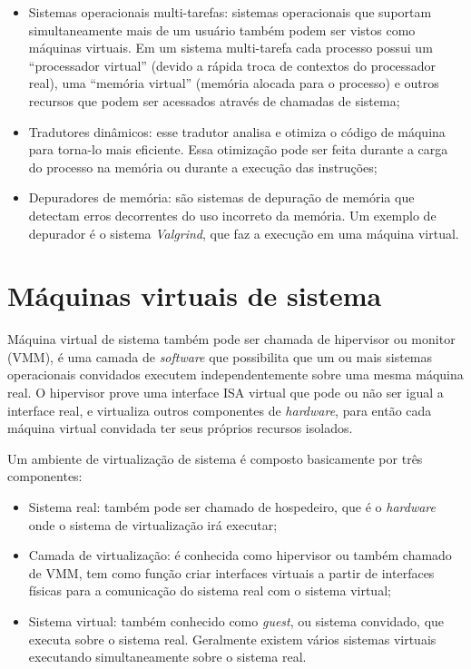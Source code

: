 \begin{itemize}
 \item Sistemas operacionais multi-tarefas: sistemas operacionais que suportam simultaneamente mais de um usuário também podem ser
 vistos como máquinas virtuais. Em um sistema multi-tarefa cada processo possui um ``processador virtual'' (devido a rápida troca de 
 contextos do processador real), uma ``memória virtual'' (memória alocada para o processo) e outros recursos que podem ser acessados
 através de chamadas de sistema;
 \item Tradutores dinâmicos: esse tradutor analisa e otimiza o código de máquina para torna-lo mais eficiente. Essa otimização pode ser
 feita durante a carga do processo na memória ou durante a execução das instruções;
 \item Depuradores de memória: são sistemas de depuração de memória que detectam erros decorrentes do uso incorreto da memória.
 Um exemplo de depurador é o sistema \textit{Valgrind}, que faz a execução em uma máquina virtual.
\end{itemize}

\section{Máquinas virtuais de sistema}
\label{section:virtsistema}

Máquina virtual de sistema também pode ser chamada de hipervisor ou monitor (\ac{VMM}), é uma camada de \textit{software} que possibilita
que um ou mais sistemas operacionais convidados executem independentemente sobre uma mesma máquina real. O hipervisor prove uma interface
\ac{ISA} virtual que pode ou não ser igual a interface real, e virtualiza outros componentes de \textit{hardware}, para então cada máquina
virtual convidada ter seus próprios recursos isolados.

Um ambiente de virtualização de sistema é composto basicamente por três componentes:
\begin{itemize}
 \item Sistema real: também pode ser chamado de hospedeiro, que é o \textit{hardware} onde o sistema de virtualização irá executar;
 \item Camada de virtualização: é conhecida como hipervisor ou também chamado de \ac{VMM}, tem como função criar interfaces virtuais a
 partir de interfaces físicas para a comunicação do sistema real com o sistema virtual;
 \item Sistema virtual: também conhecido como \textit{guest}, ou sistema convidado, que executa sobre o sistema real. Geralmente
 existem vários sistemas virtuais executando simultaneamente sobre o sistema real.
\end{itemize}

